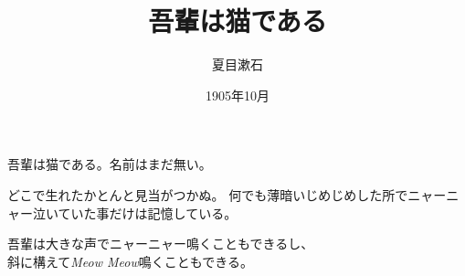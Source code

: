 \documentclass{tarticle}
\title{吾輩は猫である}
\author{夏目漱石}
\date{1905年10月}
\begin{document}
吾輩は猫である。名前はまだ無い。

どこで生れたかとんと見当がつかぬ。
何でも薄暗いじめじめした所でニャーニャー泣いていた事だけは記憶している。


吾輩は大きな声で{\LARGE ニャーニャー}鳴くこともできるし、\\
斜に構えて\textit{Meow Meow}鳴くこともできる。
\end{document}

